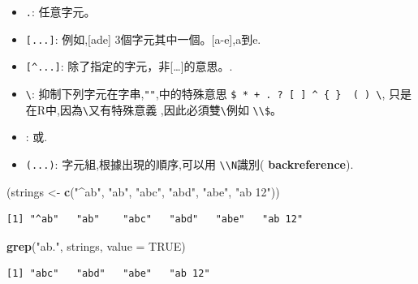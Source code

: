 \documentclass[]{book}
\newenvironment{Shaded}{\begin{snugshade}}{\end{snugshade}}
\newcommand{\DataTypeTok}[1]{\textcolor[rgb]{0.13,0.29,0.53}{#1}}
\newcommand{\KeywordTok}[1]{\textcolor[rgb]{0.13,0.29,0.53}{\textbf{#1}}}
\newcommand{\NormalTok}[1]{#1}
\newcommand{\OtherTok}[1]{\textcolor[rgb]{0.56,0.35,0.01}{#1}}
\newcommand{\StringTok}[1]{\textcolor[rgb]{0.31,0.60,0.02}{#1}}
\providecommand{\tightlist}{%
  \setlength{\itemsep}{0pt}\setlength{\parskip}{0pt}}
\theoremstyle{definition}
\theoremstyle{definition}
\theoremstyle{definition}
\theoremstyle{remark}
\begin{document}
\begin{itemize}
\tightlist
\item
  \texttt{.}: 任意字元。\\
\item
  \texttt{{[}...{]}}: 例如,{[}ade{]} 3個字元其中一個。{[}a-e{]},a到e.\\
\item
  \texttt{{[}\^{}...{]}}:
  除了\protect\hyperlink{section-1}{}指定的字元，非{[}\ldots{}{]}的意思。.\\
\item
  \texttt{\textbackslash{}}: 抑制下列字元在字串,\texttt{""},中的特殊意思
  \texttt{\$\ *\ +\ .\ ?\ {[}\ {]}\ \^{}\ \{\ \}\ \textbar{}\ (\ )\ \textbackslash{}},
  只是在R中,因為\texttt{\textbackslash{}}又有特殊意義
  ,因此必須雙\texttt{\textbackslash{}}例如
  \texttt{\textbackslash{}\textbackslash{}\$}。\\
\item
  \texttt{\textbar{}}: 或.\\
\item
  \texttt{(...)}: 字元組,根據出現的順序,可以用
  \texttt{\textbackslash{}\textbackslash{}N}識別(
  \textbf{backreference}).
\end{itemize}

\begin{Shaded}
\begin{Highlighting}[]
\NormalTok{(strings <-}\StringTok{ }\KeywordTok{c}\NormalTok{(}\StringTok{"^ab"}\NormalTok{, }\StringTok{"ab"}\NormalTok{, }\StringTok{"abc"}\NormalTok{, }\StringTok{"abd"}\NormalTok{, }\StringTok{"abe"}\NormalTok{, }\StringTok{"ab 12"}\NormalTok{))}
\end{Highlighting}
\end{Shaded}

\begin{verbatim}
[1] "^ab"   "ab"    "abc"   "abd"   "abe"   "ab 12"
\end{verbatim}

\begin{Shaded}
\begin{Highlighting}[]
\KeywordTok{grep}\NormalTok{(}\StringTok{"ab."}\NormalTok{, strings, }\DataTypeTok{value =} \OtherTok{TRUE}\NormalTok{) }
\end{Highlighting}
\end{Shaded}

\begin{verbatim}
[1] "abc"   "abd"   "abe"   "ab 12"
\end{verbatim}
\end{document}
